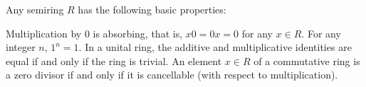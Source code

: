 \begin{proposition}\label{thm:semiring_properties}
  Any semiring \( R \) has the following basic properties:
  \begin{thmenum}
     Multiplication by \( 0 \) is absorbing, that is, \( x0 = 0x = 0 \) for any \( x \in R \).
     For any integer \( n \), \( 1^n = 1 \).
     In a unital ring, the additive and multiplicative identities are equal if and only if the ring is trivial.
     An element \( x \in R \) of a commutative ring is a zero divisor if and only if it is cancellable (with respect to multiplication).
  \end{thmenum}
\end{proposition}

